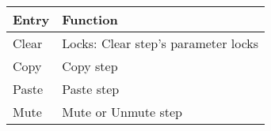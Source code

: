 \begin{figure}[hb]
    \begin{tabular}{|l|l|}
    \hline
    \rowcolor[HTML]{C0C0C0} 
    Entry            & Function \\ \hline
    Clear            & Locks: Clear step's parameter locks \\ \hline
    Copy         & Copy step\\ \hline
    Paste        & Paste step\\ \hline
    Mute         & Mute or Unmute step\\ \hline
    \end{tabular}
\end{figure}